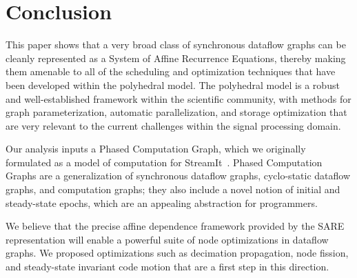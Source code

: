 \section{Conclusion}

This paper shows that a very broad class of synchronous dataflow
graphs can be cleanly represented as a System of Affine Recurrence
Equations, thereby making them amenable to all of the scheduling and
optimization techniques that have been developed within the polyhedral
model.  The polyhedral model is a robust and well-established
framework within the scientific community, with methods for graph
parameterization, automatic parallelization, and storage optimization
that are very relevant to the current challenges within the signal
processing domain.  

Our analysis inputs a Phased Computation Graph, which we originally
formulated as a model of computation for StreamIt~\cite{streamitcc}.
Phased Computation Graphs are a generalization of synchronous dataflow
graphs, cyclo-static dataflow graphs, and computation graphs; they
also include a novel notion of initial and steady-state epochs, which
are an appealing abstraction for programmers.

We believe that the precise affine dependence framework provided by
the SARE representation will enable a powerful suite of node
optimizations in dataflow graphs.  We proposed optimizations such as
decimation propagation, node fission, and steady-state invariant code
motion that are a first step in this direction.
